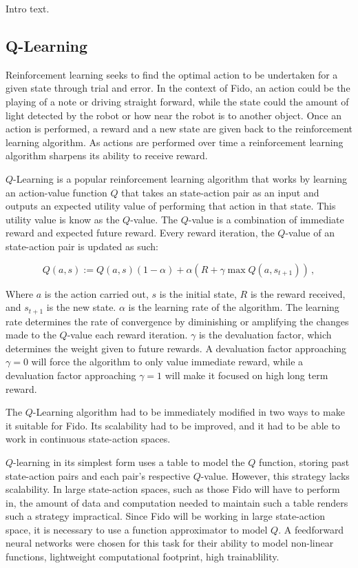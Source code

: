 Intro text.

\subsection{Q-Learning}

Reinforcement learning seeks to find the optimal action to be undertaken for a given state through trial and error. In the context of Fido, an action could be the playing of a note or driving straight forward, while the state could the amount of light detected by the robot or how near the robot is to another object. Once an action is performed, a reward and a new state are given back to the reinforcement learning algorithm.  As actions are performed over time a reinforcement learning algorithm sharpens its ability to receive reward.

$Q$-Learning \cite{watkins} is a popular reinforcement learning algorithm that works by learning an action-value function $Q$ that takes an state-action pair as an input and outputs an expected utility value of performing that action in that state. This utility value is know as the $Q$-value. The $Q$-value is a combination of immediate reward and expected future reward. Every reward iteration, the $Q$-value of an state-action pair is updated as such:

\begin{equation}
	Q(a, s) := Q(a, s)(1 - \alpha) + \alpha(R + \gamma \max Q(a, s_{t+1}))
	\,,
\end{equation}

Where $a$ is the action carried out, $s$ is the initial state, $R$ is the reward received, and $s_{t+1}$ is the new state. $\alpha$ is the learning rate of the algorithm. The learning rate determines the rate of convergence by diminishing or amplifying the changes made to the $Q$-value each reward iteration. $\gamma$ is the devaluation factor, which determines the weight given to future rewards. A devaluation factor approaching $\gamma=0$ will force the algorithm to only value immediate reward, while a devaluation factor approaching $\gamma=1$ will make it focused on high long term reward.

The $Q$-Learning algorithm had to be immediately modified in two ways to make it suitable for Fido. Its scalability had to be improved, and it had to be able to work in continuous state-action spaces. 

$Q$-learning in its simplest form uses a table to model the $Q$ function, storing past state-action pairs and each pair's respective $Q$-value.  However, this strategy lacks scalability. In large state-action spaces, such as those Fido will have to perform in, the amount of data and computation needed to maintain such a table renders such a strategy impractical. Since Fido will be working in large state-action space, it is necessary to use a function approximator to model $Q$. A feedforward neural networks were chosen for this task for their ability to model non-linear functions, lightweight computational footprint, high trainablility.

